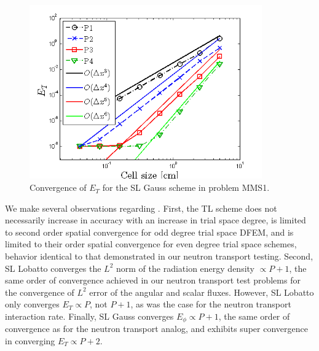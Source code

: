 %
%
\begin{figure}[!ht]
\centering
\includegraphics[width=10cm]{chapter6_grey_radtran/Dissertation_Data/MMS2_SLXS_Gauss_temp_L2.png}
\caption{Convergence of $E_{T}$ for the SL Gauss scheme in problem MMS1.}
\label{fig:mms1_gauss_temp}
\end{figure}

We make several observations regarding .  
First, the TL scheme does not necessarily increase in accuracy with an increase in trial space degree, is limited to second order spatial convergence for odd degree trial space DFEM, and is limited to their order spatial convergence for even degree trial space schemes, behavior identical to that demonstrated in our neutron transport testing.
Second, SL Lobatto converges the $L^2$ norm of the radiation energy density $\propto P+1$, the same order of convergence achieved in our neutron transport test problems for the convergence of $L^2$ error of the angular and scalar fluxes.
However, SL Lobatto only converges $E_T \propto P$, not $P+1$, as was the case for the neutron transport interaction rate.
Finally, SL Gauss converges $E_{\phi} \propto P+1$, the same order of convergence as for the neutron transport analog, and exhibits super convergence in converging $E_T \propto P+2$.

